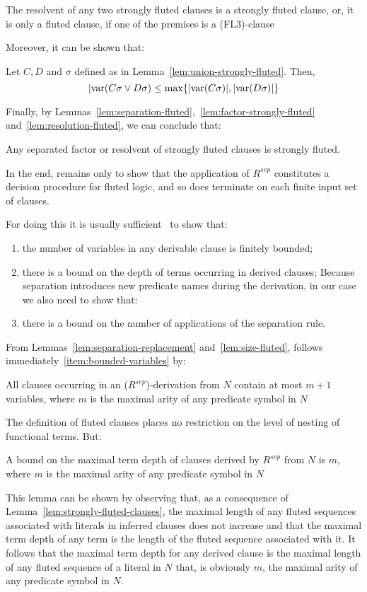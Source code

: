 \begin{lemma}\label{lem:resolution-fluted}
  The resolvent of any two strongly fluted clauses is a strongly fluted clause, or, it is only a fluted clause, if one of the premises is a (FL3)-clause
\end{lemma}
Moreover, it can be shown that:

\begin{lemma}\label{lem:size-fluted}
  Let \(C,D\) and \(\sigma\) defined as in Lemma~\ref{lem:union-strongly-fluted}. Then,
  \[ |\text{var} (C\sigma \lor D\sigma) \leq \max\{ |\text{var} (C\sigma)|,|\text{var} (D\sigma)|\}\]
\end{lemma}
Finally, by Lemmas~\ref{lem:separation-fluted},~\ref{lem:factor-strongly-fluted} and~\ref{lem:resolution-fluted}, we can conclude that:
\begin{lemma}
  Any separated factor or resolvent of strongly fluted clauses is strongly fluted.
\end{lemma}
In the end, remains only to show that the application of \(R^{sep}\) constitutes a decision procedure for fluted logic, and so does terminate on each finite input set of clauses.

For doing this it is usually sufficient~\cite{joyner1976resolution} to show that:
\begin{enumerate}[label= (\roman*)]
  \item\label{item:bounded-variables} the number of variables in any derivable clause is finitely bounded;
  \item\label{item:bounded-depth} there is a bound on the depth of terms occurring in derived clauses;
  Because separation introduces new predicate names during the derivation, in our case we also need to show that:
  \item\label{item:bounded-separation} there is a bound on the number of applications of the separation rule.
\end{enumerate}

From Lemmas~\ref{lem:separation-replacement} and~\ref{lem:size-fluted}, follows immediately~\ref{item:bounded-variables} by:
\begin{lemma}\label{lem:bounded-variables}
  All clauses occurring in an (\(R^{sep}\))-derivation from \(N\) contain at most \(m+1\) variables, where \(m\) is the maximal arity of any predicate symbol in \(N\)
\end{lemma}
The definition of fluted clauses places no restriction on the level of nesting of functional terms. But:
\begin{lemma}\label{lem:bounded-depth}
  A bound on the maximal term depth of clauses derived by \(R^{sep}\) from \(N\) is \(m\), where \(m\) is the maximal arity of any predicate symbol in \(N\)
\end{lemma}
This lemma can be shown by observing that, as a consequence of Lemma~\ref{lem:strongly-fluted-clauses}, the maximal length of any fluted sequences associated with literals in inferred clauses does not increase and that the maximal term depth of any term is the length of the fluted sequence associated with it.
It follows that the maximal term depth for any derived clause is the maximal length of any fluted sequence of a literal in \(N\) that, is obviously \(m\), the maximal arity of any predicate symbol in \(N\).

